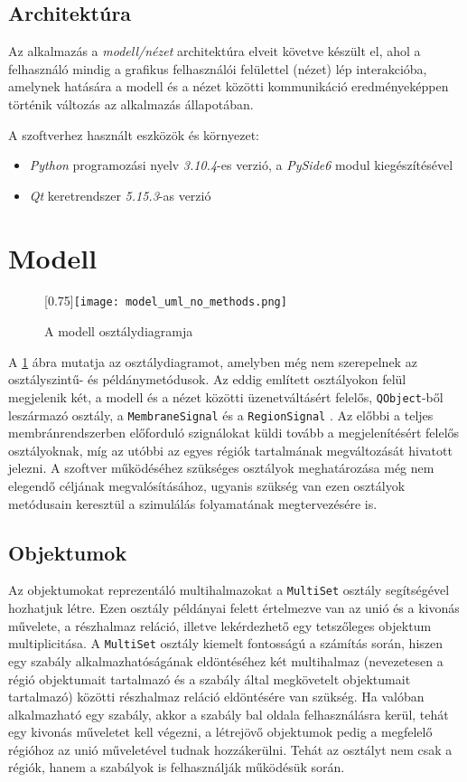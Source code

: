 \subsection{Architektúra}
Az alkalmazás a \textit{modell/nézet} architektúra elveit követve készült el, ahol a felhasználó mindig a grafikus felhasználói felülettel (nézet) lép interakcióba, amelynek hatására a modell és a nézet közötti kommunikáció eredményeképpen történik változás az alkalmazás állapotában.

A szoftverhez használt eszközök és környezet:
\begin{itemize}
\item \textit{Python} programozási nyelv \textit{3.10.4}-es verzió, a \textit{PySide6} modul kiegészítésével
\item \textit{Qt} keretrendszer \textit{5.15.3}-as verzió
\end{itemize}

\section{Modell}

\begin{figure}[H]
\advance\leftskip-3cm
	\scalebox{0.75}[0.75]{\texttt{[image: model\_uml\_no\_methods.png]}}
	\caption{A modell osztálydiagramja}
	\label{fig:model_no_methods}
\end{figure}

A \ref{fig:model_no_methods} ábra mutatja az osztálydiagramot, amelyben még nem szerepelnek az osztályszintű- és példánymetódusok. Az eddig említett osztályokon felül megjelenik két, a modell és a nézet közötti üzenetváltásért felelős, \verb|QObject|-ből leszármazó osztály, a \verb|MembraneSignal| és a \verb|RegionSignal| . Az előbbi a teljes membránrendszerben előforduló szignálokat küldi tovább a megjelenítésért felelős osztályoknak, míg az utóbbi az egyes régiók tartalmának megváltozását hivatott jelezni. A szoftver működéséhez szükséges osztályok meghatározása még nem elegendő céljának megvalósításához, ugyanis szükség van ezen osztályok metódusain keresztül a szimulálás folyamatának megtervezésére is.

\subsection{Objektumok}

Az objektumokat reprezentáló multihalmazokat a \verb|MultiSet| osztály segítségével hozhatjuk létre. Ezen osztály példányai felett értelmezve van az unió és a kivonás művelete, a részhalmaz reláció, illetve lekérdezhető egy tetszőleges objektum multiplicitása. A \verb|MultiSet| osztály kiemelt fontosságú a számítás során, hiszen egy szabály alkalmazhatóságának eldöntéséhez két multihalmaz (nevezetesen a régió objektumait tartalmazó és a szabály által megkövetelt objektumait tartalmazó) közötti részhalmaz reláció eldöntésére van szükség. Ha valóban alkalmazható egy szabály, akkor a szabály bal oldala felhasználásra kerül, tehát egy kivonás műveletet kell végezni, a létrejövő objektumok pedig a megfelelő régióhoz az unió műveletével tudnak hozzákerülni. Tehát az osztályt nem csak a régiók, hanem a szabályok is felhasználják működésük során.

